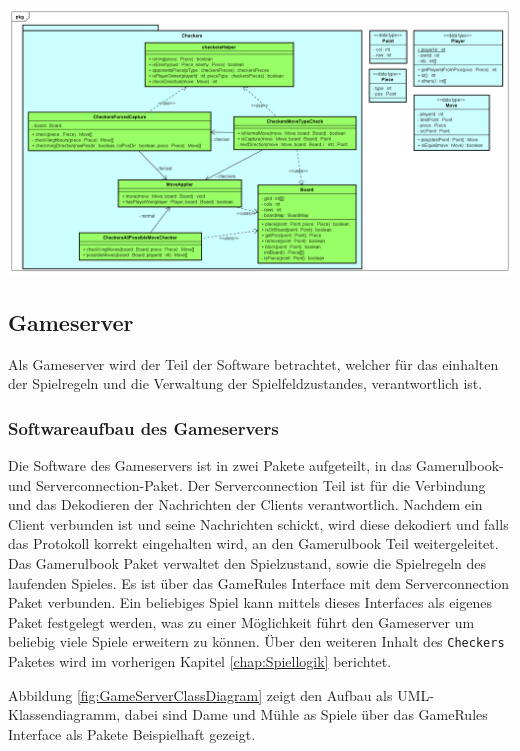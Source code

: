 \documentclass[12pt,a4paper,bibliography=totocnumbered,listof=totocnumbered]{article}
\begin{document}
\vspace{1em}
\begin{minipage}{\linewidth}
	\centering
	\includegraphics[width=1.0\linewidth]{pics/GameLogic.png}
	\label{fig:GameLogic}
\end{minipage}


\subsection{Gameserver}
Als Gameserver wird der Teil der Software betrachtet, welcher für das einhalten der Spielregeln und die Verwaltung der Spielfeldzustandes, 
verantwortlich ist. 

\subsubsection{Softwareaufbau des Gameservers}
Die Software des Gameservers ist in zwei Pakete aufgeteilt, in das Gamerulbook- und Serverconnection-Paket.
Der Serverconnection Teil ist für die Verbindung und das Dekodieren der Nachrichten der Clients verantwortlich.
Nachdem ein Client verbunden ist und seine Nachrichten schickt, wird diese dekodiert und falls das Protokoll korrekt eingehalten wird,
an den Gamerulbook Teil weitergeleitet. Das Gamerulbook Paket verwaltet den Spielzustand, sowie die Spielregeln des laufenden Spieles.
Es ist über das GameRules Interface mit dem Serverconnection Paket verbunden. Ein beliebiges Spiel kann mittels dieses Interfaces
als eigenes Paket festgelegt werden, was zu einer Möglichkeit führt den Gameserver um beliebig viele Spiele erweitern zu können.
Über den weiteren Inhalt des \texttt{Checkers} Paketes wird im vorherigen Kapitel \ref{chap:Spiellogik} berichtet.

Abbildung \ref{fig:GameServerClassDiagram} zeigt den Aufbau als UML-Klassendiagramm, dabei sind Dame und Mühle as Spiele über das
GameRules Interface als Pakete Beispielhaft gezeigt. 
\end{document}
